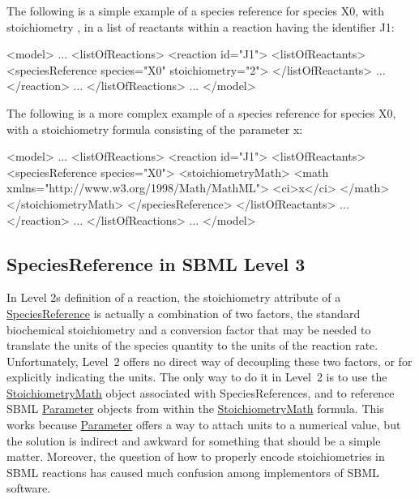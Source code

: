 The following is a simple example of a species reference for species {\ttfamily X0}, with stoichiometry {}, in a list of reactants within a reaction having the identifier {\ttfamily J1\+:} \begin{DoxyVerb}<model>
    ...
    <listOfReactions>
        <reaction id="J1">
            <listOfReactants>
                <speciesReference species="X0" stoichiometry="2">
            </listOfReactants>
            ...
        </reaction>
        ...
    </listOfReactions>
    ...
</model>
\end{DoxyVerb}


The following is a more complex example of a species reference for species X0, with a stoichiometry formula consisting of the parameter {\ttfamily x\+:} \begin{DoxyVerb}<model>
    ...
    <listOfReactions>
        <reaction id="J1">
            <listOfReactants>
                <speciesReference species="X0">
                    <stoichiometryMath>
                        <math xmlns="http://www.w3.org/1998/Math/MathML">
                            <ci>x</ci>
                        </math>
                    </stoichiometryMath>
                </speciesReference>
            </listOfReactants>
            ...
        </reaction>
        ...
    </listOfReactions>
    ...
</model>
\end{DoxyVerb}
\hypertarget{class_species_reference_spr-l3}{}\subsection{Species\+Reference in S\+B\+M\+L Level 3}\label{class_species_reference_spr-l3}
In Level 2\textquotesingle{}s definition of a reaction, the stoichiometry attribute of a \hyperlink{class_species_reference}{Species\+Reference} is actually a combination of two factors, the standard biochemical stoichiometry and a conversion factor that may be needed to translate the units of the species quantity to the units of the reaction rate. Unfortunately, Level~2 offers no direct way of decoupling these two factors, or for explicitly indicating the units. The only way to do it in Level~2 is to use the \hyperlink{class_stoichiometry_math}{Stoichiometry\+Math} object associated with Species\+References, and to reference S\+B\+ML \hyperlink{class_parameter}{Parameter} objects from within the \hyperlink{class_stoichiometry_math}{Stoichiometry\+Math} formula. This works because \hyperlink{class_parameter}{Parameter} offers a way to attach units to a numerical value, but the solution is indirect and awkward for something that should be a simple matter. Moreover, the question of how to properly encode stoichiometries in S\+B\+ML reactions has caused much confusion among implementors of S\+B\+ML software.

